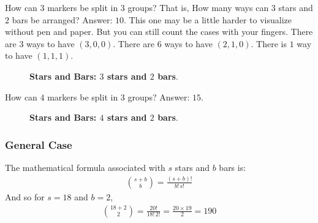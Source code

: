 \documentclass[12pt]{article}
\begin{document}
\clearpage
How can $3$ markers be split in $3$ groups? That is, How many ways can $3$ stars and $2$ bars be arranged? Answer: $10$. This one may be a little harder to visualize without pen and paper. But you can still count the cases with your fingers. There are $3$ ways to have $(3,0,0)$. There are $6$ ways to have $(2,1,0)$. There is $1$ way to have $(1,1,1)$.
\begin{figure}[hptb]
\begin{minipage}[b]{\textwidth}
\centering
{}
\caption{\textbf{Stars and Bars: $3$ stars and $2$ bars}.
\label{fig:stars:bars:3}}
\end{minipage}
\end{figure}


\clearpage
How can $4$ markers be split in $3$ groups? Answer: $15$.
\begin{figure}[hptb]
\begin{minipage}[b]{\textwidth}
\centering
{}
\caption{\textbf{Stars and Bars: $4$ stars and $2$ bars}.
\label{fig:stars:bars:4}}
\end{minipage}
\end{figure}


\subsubsection*{General Case}
The mathematical formula associated with $s$ stars and $b$ bars is:
\begin{align*}
\binom{s + b}{b} = \frac{(s+b)!}{b!\,s!}
\end{align*}
And so for $s=18$ and $b=2$,
\begin{align*}
\binom{18 + 2}{2} 
  = \frac{20!}{18!\,2!} 
  = \frac{20 \times 19}{2} 
  = 190 
\end{align*}
\end{document}
